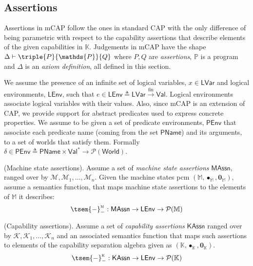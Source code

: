 \subsection{Assertions}

Assertions in mCAP follow the ones in standard CAP with the only difference of being parametric with respect to the capability assertions that describe elements of the given capabilities in $\mathbb{K}$. Judgements in mCAP have the shape $\Delta \vdash \triple{P}{\mathds{P}}{Q}$ where $P, Q$ are \textit{assertions}, $\mathds{P}$ is a program and $\Delta$ is an \textit{axiom definition}, all defined in this section.

We assume the presence of an infinite set of logical variables, $x \in \mathsf{LVar}$ and logical environments, $\mathsf{LEnv}$, such that $e \in \mathsf{LEnv} \triangleq \mathsf{LVar} \xrightarrow{\text{fin}} \mathsf{Val}$. Logical environments associate logical variables with their values. Also, since mCAP is an extension of CAP, we provide support for abstract predicates used to express concrete properties. We assume to be given a set of predicate environments, $\mathsf{PEnv}$ that associate each predicate name (coming from the set $\mathsf{PName}$) and its arguments, to a set of worlds that satisfy them. Formally $\delta \in \mathsf{PEnv} \triangleq \mathsf{PName} \times \mathsf{Val}^* \rightarrow \mathcal{P}(\mathsf{World})$.

\begin{param}
	(Machine state assertions).
	Assume a set of \emph{machine state assertions} $\mathsf{MAssn}$, ranged over by $\mathcal{M}, \mathcal{M}_1, \ldots, \mathcal{M}_n$. Given the machine states pcm $(\mathbb{M}, \bullet_\mathbb{M}, \mathbf{0}_\mathbb{M})$, assume a semantics function, that maps machine state assertions to the elements of $\mathbb{M}$ it describes:
	\[
		\tsem{-}_-^\textsc{m} : \mathsf{MAssn} \rightarrow \mathsf{LEnv} \rightarrow \mathcal{P}(\mathbb{M})
	\]
\end{param}

\begin{param}
	(Capability assertions).
	Assume a set of \emph{capability assertions} $\mathsf{KAssn}$ ranged over by $\mathcal{K}, \mathcal{K}_1, \ldots, \mathcal{K}_n$ and an associated semantics function that maps such assertions to elements of the capability separation algebra given as $(\mathbb{K}, \bullet_\mathbb{K}, \mathbf{0}_\mathbb{K})$.
	\[
		\tsem{-}_-^\textsc{k} : \mathsf{KAssn} \rightarrow \mathsf{LEnv} \rightarrow \mathcal{P}(\mathbb{K})
	\]
\end{param}

